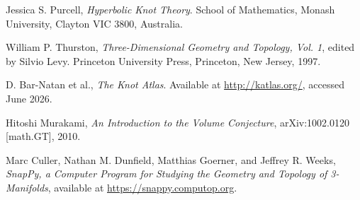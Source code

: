 
Jessica S. Purcell,
\textit{Hyperbolic Knot Theory}.
School of Mathematics, Monash University,
Clayton VIC 3800, Australia.

William P. Thurston,
\textit{Three-Dimensional Geometry and Topology, Vol. 1},
edited by Silvio Levy.
Princeton University Press,
Princeton, New Jersey, 1997.

D. Bar-Natan et al.,
\emph{The Knot Atlas}.
Available at \url{http://katlas.org/},
accessed June 2026.

Hitoshi Murakami,
\emph{An Introduction to the Volume Conjecture},
arXiv:1002.0120 [math.GT], 2010.

Marc Culler, Nathan M. Dunfield, Matthias Goerner, and Jeffrey R. Weeks,
\emph{SnapPy, a Computer Program for Studying the Geometry and Topology of 3-Manifolds},
available at \url{https://snappy.computop.org}.